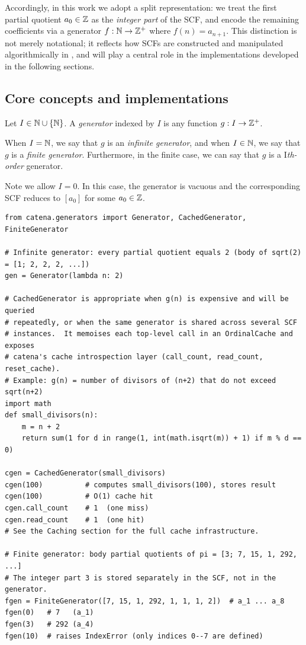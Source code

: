 Accordingly, in this work we adopt a split representation: we treat the first partial quotient $a_0 \in \mathbb{Z}$ 
as the \textit{integer part} of the SCF, and encode the remaining coefficients via a generator $f: \mathbb{N} \to \mathbb{Z}^+$ 
where $f(n) = a_{n+1}$. This distinction is not merely notational; it reflects how SCFs are 
constructed and manipulated algorithmically in \catena, and will play a central role in the 
implementations developed in the following sections.

\subsection{Core concepts and implementations}

\begin{definition}
  Let $I \in \mathbb{N} \cup \{\mathbb{N}\}$. A \textit{generator} indexed by $I$ is any function 
  $g: I \to \mathbb{Z}^+$. 
  
  When $I = \mathbb{N}$, we say that $g$ is an \textit{infinite generator}, and when 
  $I \in \mathbb{N}$, we say that $g$ is a \textit{finite generator}. Furthermore, in the finite case, we can say that $g$ is 
  a I\textit{th-order} generator.
\end{definition}

\begin{remark}
    Note we allow $I = 0$. In this case, the generator is vacuous and the corresponding SCF reduces to $[a_0]$ for some $a_0 \in \mathbb{Z}$.
\end{remark}

\begin{catenadef}
\begin{lstlisting}[style=python]
from catena.generators import Generator, CachedGenerator, FiniteGenerator

# Infinite generator: every partial quotient equals 2 (body of sqrt(2) = [1; 2, 2, 2, ...])
gen = Generator(lambda n: 2)

# CachedGenerator is appropriate when g(n) is expensive and will be queried
# repeatedly, or when the same generator is shared across several SCF
# instances.  It memoises each top-level call in an OrdinalCache and exposes
# catena's cache introspection layer (call_count, read_count, reset_cache).
# Example: g(n) = number of divisors of (n+2) that do not exceed sqrt(n+2)
import math
def small_divisors(n):
    m = n + 2
    return sum(1 for d in range(1, int(math.isqrt(m)) + 1) if m % d == 0)

cgen = CachedGenerator(small_divisors)
cgen(100)          # computes small_divisors(100), stores result
cgen(100)          # O(1) cache hit
cgen.call_count    # 1  (one miss)
cgen.read_count    # 1  (one hit)
# See the Caching section for the full cache infrastructure.

# Finite generator: body partial quotients of pi = [3; 7, 15, 1, 292, ...]
# The integer part 3 is stored separately in the SCF, not in the generator.
fgen = FiniteGenerator([7, 15, 1, 292, 1, 1, 1, 2])  # a_1 ... a_8
fgen(0)   # 7   (a_1)
fgen(3)   # 292 (a_4)
fgen(10)  # raises IndexError (only indices 0--7 are defined)
\end{lstlisting}
\end{catenadef}


